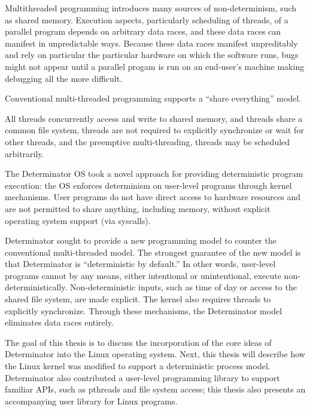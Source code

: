 Multithreaded programming introduces many sources of non-determinism, such as
shared memory. Execution aspects, particularly scheduling of threads, of a
parallel program depends on arbitrary data races, and these data races can
manifest in unpredictable ways. Because these data races manifest unpreditably
and rely on particular the particular hardware on which the software runs, bugs
might not appear until a parallel progam is run on an end-user's machine making
debugging all the more difficult.

Conventional multi-threaded programming supports a ``share everything'' model.

All threads concurrently access and write to shared memory, and threads share a
common file system, threads are not required to explicitly synchronize or wait
for other threads, and the preemptive multi-threading, threads may be scheduled
arbitrarily.

The Determinator OS took a novel approach for providing deterministic program
execution: the OS enforces determinism on user-level programs through kernel
mechanisms. User programs do not have direct access to hardware resources and
are not permitted to share anything, including memory, without explicit
operating system support (via syscalls).

Determinator sought to provide a new programming model to counter the
conventional multi-threaded model. The strongest guarantee of the new model
is that Determinator is ``deterministic by default.'' In other words, user-level
programs cannot by any means, either intentional or unintentional, execute
non-deterministically. Non-deterministic inputs, such as time of day or access
to the shared file system, are made explicit. The kernel also requires threads
to explicitly synchronize. Through these mechanisms, the Determinator model
eliminates data races entirely.

The goal of this thesis is to discuss the incorporation of the core ideas of
Determinator into the Linux operating system. Next, this thesis will describe
how the Linux kernel was modified to support a deterministic process model.
Determinator also contributed a user-level programming library to support
familiar APIs, such as pthreads and file system access; this thesis also
presents an accompanying user library for Linux programs.

\fi
\endinput

